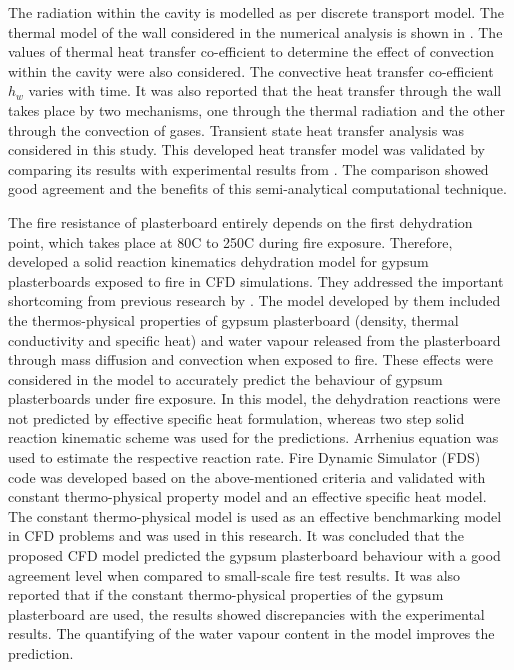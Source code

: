 The radiation within the cavity is modelled as per discrete transport model. The thermal model of the wall considered in the numerical analysis is shown in . The values of thermal heat transfer co-efficient to determine the effect of convection within the cavity were also considered. The convective heat transfer co-efficient $h_w$ varies with time. It was also reported that the heat transfer through the wall takes place by two mechanisms, one through the thermal radiation and the other through the convection of gases. Transient state heat transfer analysis was considered in this study. This developed heat transfer model was validated by comparing its results with experimental results from \citet{Tofilo2005}. The comparison showed good agreement and the benefits of this semi-analytical computational technique. 

The fire resistance of plasterboard entirely depends on the first dehydration point, which takes place at 80\degree C to 250\degree C during fire exposure. Therefore, \citet{Kolaitis2013} developed a solid reaction kinematics dehydration model for gypsum plasterboards exposed to fire in CFD simulations. They addressed the important shortcoming from previous research by \citet{Horvat2009}. The model developed by them included the thermos-physical properties of gypsum plasterboard (density, thermal conductivity and specific heat) and water vapour released from the plasterboard through mass diffusion and convection when exposed to fire. These effects were considered in the model to accurately predict the behaviour of gypsum plasterboards under fire exposure. In this model, the dehydration reactions were not predicted by effective specific heat formulation, whereas two step solid reaction kinematic scheme was used for the predictions. Arrhenius equation was used to estimate the respective reaction rate. Fire Dynamic Simulator (FDS) code was developed based on the above-mentioned criteria and validated with constant thermo-physical property model and an effective specific heat model. The constant thermo-physical model is used as an effective benchmarking model in CFD problems and was used in this research. It was concluded that the proposed CFD model predicted the gypsum plasterboard behaviour with a good agreement level when compared to small-scale fire test results. It was also reported that if the constant thermo-physical properties of the gypsum plasterboard are used, the results showed discrepancies with the experimental results. The quantifying of the water vapour content in the model improves the prediction. 

